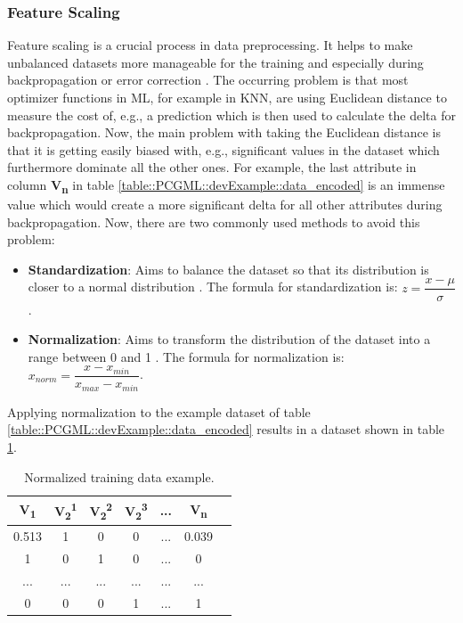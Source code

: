 \documentclass[MGS,Master,english]{twbook}%
\begin{document}
\subsubsection{Feature Scaling} %
Feature scaling is a crucial process in data preprocessing. It helps to make unbalanced datasets more manageable for the training and especially during backpropagation or error correction \cite{ml::book::developer}. The occurring problem is that most optimizer functions in ML, for example in \ac{KNN}, are using Euclidean distance to measure the cost of, e.g., a prediction which is then used to calculate the delta for backpropagation. Now, the main problem with taking the Euclidean distance is that it is getting easily biased with, e.g., significant values in the dataset which furthermore dominate all the other ones. For example, the last attribute in column \textbf{V\textsubscript{n}} in table \ref{table::PCGML::devExample::data_encoded} is an immense value which would create a more significant delta for all other attributes during backpropagation. Now, there are two commonly used methods to avoid this problem:
\begin{itemize}
	\item \textbf{Standardization}: Aims to balance the dataset so that its distribution is closer to a normal distribution \cite{ml::book::developer}. The formula for standardization is: $z={\dfrac{x - \mu}{\sigma}}$.
	\item \textbf{Normalization}: Aims to transform the distribution of the dataset into a range between 0 and 1 \cite{ml::book::developer}. The formula for normalization is: $x_{norm}={\dfrac{x - x_{min}}{x_{max}-x_{min}}}$.
\end{itemize}
Applying normalization to the example dataset of table \ref{table::PCGML::devExample::data_encoded} results in a dataset shown in table \ref{table::PCGML::devExample::data_normalized}.
\begin{table}[!htbp]
	\centering
	\begin{tabular}{|c|c|c|c|c|c|c|}
		\hline
		\textbf{V\textsubscript{1}} & \textbf{V\textsubscript{2}\textsuperscript{1}}& \textbf{V\textsubscript{2}\textsuperscript{2}}& \textbf{V\textsubscript{2}\textsuperscript{3}} & \textbf{...} & \textbf{V\textsubscript{n}} \\ \hline\hline
		0.513      & 1   & 0   & 0       & ...          & 0.039         \\ \hline
		1           & 0   & 1   & 0       & ...          & 0          \\ \hline
		...         & ... & ... & ...     & ...          & ...         \\ \hline
		0      & 0   & 0   & 1       & ...          & 1         \\ \hline
	\end{tabular}
	\caption{Normalized training data example.}
	\label{table::PCGML::devExample::data_normalized}
\end{table}
\end{document}

